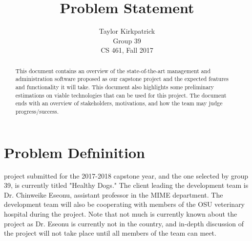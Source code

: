 \documentclass[10pt,peerreview,draftclsnofoot,onecolumn,final,margin=0.75in]{IEEEtran}
\begin{document}
\title{Problem Statement}

\author{Taylor Kirkpatrick \\ Group 39 \\CS 461, Fall 2017}

\maketitle

\begin{abstract}
This document contains an overview of the state-of-the-art management and administration
software proposed as our capstone project and the expected features and functionality it 
will take. This document also highlights some preliminary estimations on viable technologies 
that can be used for this project. The document ends with an overview of stakeholders, motivations, 
and how the team may judge progress/success.

\end{abstract}
\newpage

\ifCLASSOPTIONcompsoc
{}
\else
\section{Problem Defninition}
\label{sec:Problem Defninition}
\fi
% 
% 
% 

% 
 project submitted for the 2017-2018 capstone year, and the one 
selected by group 39, is currently titled "Healthy Dogs." The client leading the development team is 
Dr. Chinweike Eseonu, assistant professor in the MIME department. The development team will also be 
cooperating with members of the OSU veterinary hospital during the project. Note that not much is 
currently known about the project as Dr. Eseonu is currently not in the country, and in-depth discussion 
of the project will not take place until all members of the team can meet. \\
\end{document}
